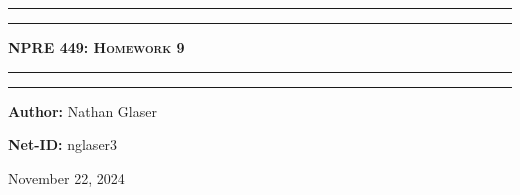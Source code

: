 \documentclass{article}
\begin{document}
\newcommand{\circled}[1]{\tikz[baseline=(char.base)]{
            \node[shape=circle,draw,inner sep=2pt] (char) {#1};}}

\newcommand{\pd}[3]{\frac{\partial^{#3}#1}{\partial {#2}^{#3}}}
\begin{titlepage}

\centering
\scshape
\vspace{\baselineskip}

%
\rule{\textwidth}{1.6pt}\vspace*{-\baselineskip}\vspace*{2pt}
\rule{\textwidth}{0.4pt}

{\Huge \textbf{\textsc{NPRE 449: Homework 9 \\
\vspace{15pt}}}}

\rule{\textwidth}{0.4pt}\vspace*{-\baselineskip}\vspace{3.2pt}
\rule{\textwidth}{1.6pt}\vspace{6pt}
\vspace{1.5\baselineskip}


\large \centerline{\textbf{Author:} Nathan Glaser}
\large \centerline{\textbf{Net-ID:} nglaser3}
\quad

\vfill
\large \centerline{November 22, 2024}
%
\end{titlepage}

\tableofcontents
\newpage
{}
\end{document}
